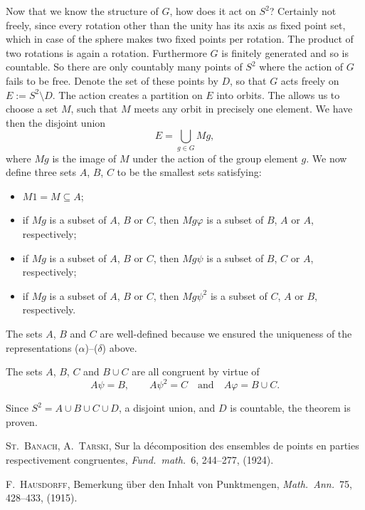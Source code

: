 \documentclass[12pt]{article}
\newcommand{\Bigcup}{\bigcup\limits}
\begin{document}
Now that we know the structure of $G$, how does it act on $S^2$?
Certainly not freely, since every rotation other than the unity has
its axis as fixed point set, which in case of the sphere makes two
fixed points per rotation. The product of two rotations is again a
rotation. Furthermore $G$ is finitely generated and so is
countable. So there are only countably many points of $S^2$ where the
action of $G$ fails to be free. Denote the set of these points by $D$,
so that $G$ acts freely on $E:=S^2\setminus D$. The action creates a
partition on $E$ into orbits. The  allows us to choose
a set $M$, such that $M$ meets any orbit in precisely one element. We
have then the disjoint union
\begin{equation*}
E=\Bigcup_{g\in G}Mg,
\end{equation*}
where $Mg$ is the image of $M$ under the action of the group element
$g$. We now define three sets $A$, $B$, $C$ to be the smallest sets satisfying:
\begin{itemize}
\item$M1=M\subseteq A$;
\item if $Mg$ is a subset of $A$, $B$ or $C$, then $Mg\varphi$ is a
  subset of $B$, $A$ or $A$, respectively;
\item if $Mg$ is a subset of $A$, $B$ or $C$, then $Mg\psi$ is a
  subset of $B$, $C$ or $A$, respectively;
\item if $Mg$ is a subset of $A$, $B$ or $C$, then $Mg\psi^2$ is a
  subset of $C$, $A$ or $B$, respectively.
\end{itemize}
The sets $A$, $B$ and $C$ are well-defined because we ensured the
uniqueness of the representations ($\alpha$)--($\delta$) above.

The sets $A$, $B$, $C$ and $B\cup C$ are all congruent by virtue of
\begin{equation*}
A\psi=B,\qquad A\psi^2=C\quad\text{and}\quad A\varphi=B\cup C.
\end{equation*}

Since $S^2=A\cup B\cup C\cup D$, a disjoint union, and $D$ is
countable, the theorem is proven.

\begin{thebibliography}{BT}

 \textsc{St.~Banach, A.~Tarski}, Sur la d\'{e}composition
  des ensembles de points en parties respectivement congruentes,
  \emph{Fund.\ math.}\ 6, 244--277, (1924).

 \textsc{F.~Hausdorff}, Bemerkung \"{u}ber den Inhalt von
  Punktmengen, \emph{Math.\ Ann.}\ 75, 428--433, (1915).

\end{thebibliography}
\end{document}
